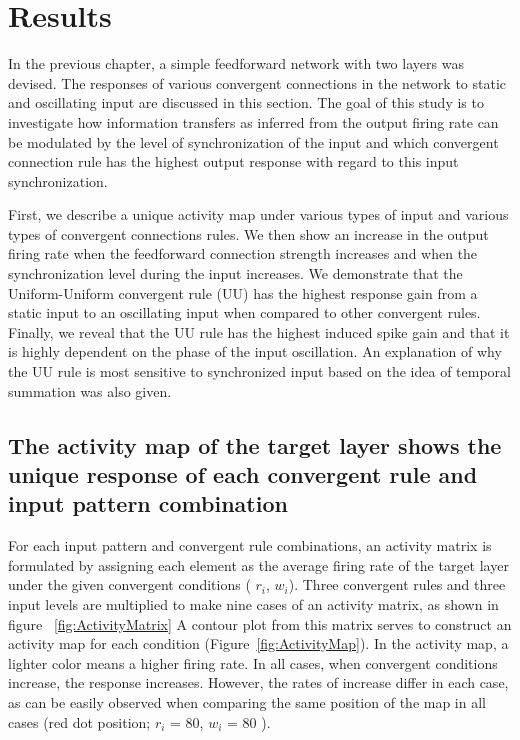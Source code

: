 \chapter{Results}
 In the previous chapter, a simple feedforward network with two layers was devised. The responses of various convergent connections in the network to static and oscillating input are discussed in this section. The goal of this study is to investigate how information transfers as inferred from the output firing rate can be modulated by the level of synchronization of the input and which convergent connection rule has the highest output response with regard to this input synchronization.

First, we describe a unique activity map under various types of input and various types of convergent connections rules. We then show an increase in the output firing rate when the feedforward connection strength increases and when the synchronization level during the input increases. We demonstrate that the Uniform-Uniform convergent rule (UU) has the highest response gain from a static input to an oscillating input when compared to other convergent rules. Finally, we reveal that the UU rule has the highest induced spike gain and that it is highly dependent on the phase of the input oscillation. An explanation of why the UU rule is most sensitive to synchronized input based on the idea of temporal summation was also given.

%
%
%
%
%
%
%
%


\section{The activity map of the target layer shows the unique response of each convergent rule and input pattern combination}
 For each input pattern and convergent rule combinations, an activity matrix is formulated by assigning each element as the average firing rate of the target layer under the given convergent conditions ( $r_i$, $w_i$). Three convergent rules and three input levels are multiplied to make nine cases of an activity matrix, as shown in figure ~\ref{fig:ActivityMatrix} 
A contour plot from this matrix serves to construct an activity map for each condition (Figure~\ref{fig:ActivityMap}). In the activity map, a lighter color means a higher firing rate.  In all cases, when convergent conditions increase, the response increases. However, the rates of increase differ in each case, as can be easily observed when comparing the same position of the map in all cases (red dot position; $r_i$ = 80, $w_i$ = 80 ). 


